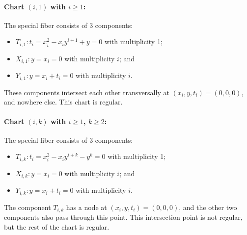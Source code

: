 \documentclass[pagesize,paper=letter]{scrartcl}
\theoremstyle{plain}
\theoremstyle{definition}
\theoremstyle{remark}
\begin{document}
\paragraph{Chart $(i, 1)$ with $i \geq 1$:}
\label{sec:case-i-1}

The special fiber consists of 3 components:
\begin{itemize}
    \item $T_{i,1}: t_i = x_i^2 - x_iy^{i+1} + y = 0$ with multiplicity 1;
    \item $X_{i,1}: y = x_i = 0$ with multiplicity $i$; and
    \item $Y_{i,1}: y = x_i + t_i = 0$ with multiplicity $i$.
\end{itemize}
These components intersect each other transversally at $(x_i, y, t_i) = (0,0,0)$, and nowhere else. This chart is regular.



\paragraph{Chart $(i, k)$ with $i\geq 1$, $k\geq 2$:}
\label{sec:higher-i-k}

The special fiber consists of 3 components:
\begin{itemize}
    \item $T_{i,k}: t_i = x_i^2 - x_iy^{i+k} - y^k = 0$ with multiplicity 1;
    \item $X_{i,k}: y = x_i = 0$ with multiplicity $i$; and
    \item $Y_{i,k}: y = x_i + t_i = 0$ with multiplicity $i$.
\end{itemize}
The component $T_{i,k}$ has a node at $(x_i,y,t_i) = (0,0,0)$, and the other two components also pass through this point. This intersection point is not regular, but the rest of the chart is regular.




\end{document}
